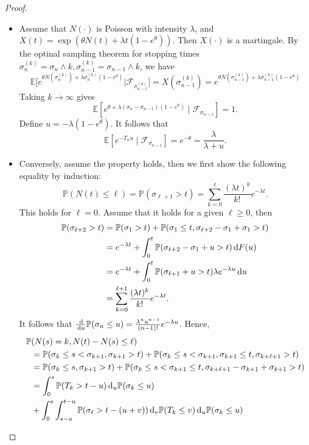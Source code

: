 \begin{proof}
\begin{itemize}
\item
Assume that $N(\cdot)$ is Poisson with intensity $\lambda$, and $X(t)=\exp(\theta N(t) + \lambda t(1-e^{\theta}))$. Then $X(\cdot)$ is a martingale.
By the optinal sampling theorem for stopping times $\sigma_n^{(k)}=\sigma_n\land k, \sigma_{n-1}^{(k)}=\sigma_{n-1}\land k$, we have
\[
\mathbb{E}\bigg[
e^{\theta N(\sigma_n^{(k)}) + \lambda\sigma_n^{(k)}(1-e^{\theta})}\bigg|\mathcal{F}_{\sigma_{n-1}^{(k)}}
\bigg]=X(\sigma_{n-1}^{(k)})=
e^{\theta N(\sigma_{n-1}^{(k)}) + \lambda\sigma_{n-1}^{(k)}(1-e^{\theta})}
\]
Taking $k\to\infty$ gives
\[
\mathbb{E}[e^{\theta + \lambda(\sigma_n - \sigma_{n-1})(1-e^{\theta})}\mid \mathcal{F}_{\sigma_{n-1}}]=1.
\]
Define $u=-\lambda(1-e^{\theta})$.
It follows that
\[
\mathbb{E}[e^{-T_nu}\mid \mathcal{F}_{\sigma_{n-1}}]=e^{-\theta}=\frac{\lambda}{\lambda + u}.
\]
\item
Conversely, assume the property holds, then we first show the following equality by induction:
\[
\mathbb{P}(N(t)\le\ell)=\mathbb{P}(\sigma_{\ell+1}>t)=\sum_{k=0}^{\ell}\frac{(\lambda t)^k}{k!}e^{-\lambda t}.
\]
This holds for $\ell=0$. Assume that it holds for a given $\ell\ge0$, then
\begin{align*}
\mathbb{P}(\sigma_{\ell+2}>t)&=\mathbb{P}(\sigma_1>t) + \mathbb{P}(\sigma_1\le t, \sigma_{\ell+2}-\sigma_1+\sigma_1>t)\\
&=e^{-\lambda t} + \int_0^t\mathbb{P}(\sigma_{\ell+2}-\sigma_1+u>t)\,\mathrm{d} F(u)\\
&=e^{-\lambda t} + \int_0^t\mathbb{P}(\sigma_{\ell+1}+u>t)\lambda e^{-\lambda u}\,\mathrm{d} u\\
&=\sum_{k=0}^{\ell+1}\frac{(\lambda t)^k}{k!}e^{-\lambda t}.
\end{align*}
It follows that $\frac{\,\mathrm{d}}{\,\mathrm{d} u}\mathbb{P}(\sigma_n\le u)=\frac{\lambda^nu^{n-1}}{(n-1)!}e^{-\lambda u}$. Hence, 
\begin{align*}
\mathbb{P}&(N(s)=k, N(t)-N(s)\le \ell)\\&=
\mathbb{P}(\sigma_k\le s<\sigma_{k+1}, \sigma_{k+1}>t)
+
\mathbb{P}(\sigma_k\le s<\sigma_{k+1}, \sigma_{k+1}\le t, \sigma_{k+\ell+1}>t)\\
&=
\mathbb{P}(\sigma_k\le s, \sigma_{k+1}>t)
+
\mathbb{P}(\sigma_k\le s<\sigma_{k+1}\le t, \sigma_{k+\ell+1}-\sigma_{k+1}+\sigma_{k+1}>t)\\
&=
\int_0^s\mathbb{P}(T_k>t-u)\diff_u\mathbb{P}(\sigma_k\le u)
\\&+
\int_0^s\int_{s-u}^{t-u}\mathbb{P}(\sigma_{\ell}>t-(u+v))\diff_v\mathbb{P}(T_k\le v)\diff_u\mathbb{P}(\sigma_k\le u)\\

\end{align*}
\end{itemize}
\end{proof}
